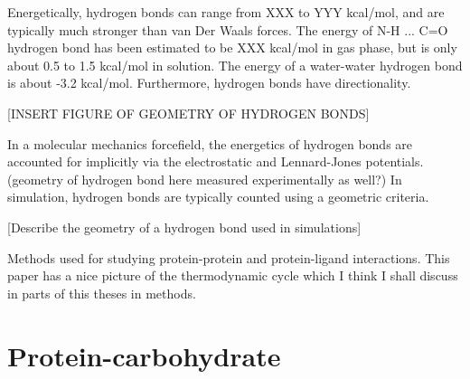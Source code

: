 Energetically, hydrogen bonds can range from XXX to YYY kcal/mol, and are typically much stronger than van Der Waals forces.  The energy of N-H ... C=O hydrogen bond has been estimated to be XXX kcal/mol in gas phase, but is only about 0.5 to 1.5 kcal/mol in solution.\cite{energetics of hydrogen bonds in peptides} The energy of a water-water hydrogen bond is about -3.2 kcal/mol.\cite{where did I see this}
Furthermore, hydrogen bonds have directionality.

[INSERT FIGURE OF GEOMETRY OF HYDROGEN BONDS]


In a molecular mechanics forcefield, the energetics of hydrogen bonds are accounted for implicitly via the electrostatic and Lennard-Jones potentials. (geometry of hydrogen bond here measured experimentally as well?) In simulation, hydrogen bonds are typically counted using a geometric criteria.

[Describe the geometry of a hydrogen bond used in simulations] 

Methods used for studying protein-protein and protein-ligand interactions.\cite{Wang:2001ez}
This paper\cite{Durrant:2011bm} has a nice picture of the thermodynamic cycle which I think I shall discuss in parts of this theses in methods.


\section{Protein-carbohydrate}

